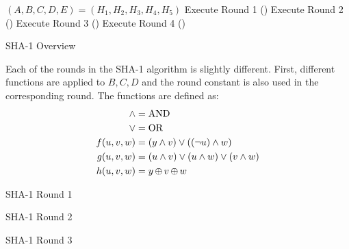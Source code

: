 \begin{algorithm}[H]
  \DontPrintSemicolon{}

  \BlankLine{}

  $(A, B, C, D, E) = (H_{1}, H_{2}, H_{3}, H_{4}, H_{5})$\;
  Execute Round 1 () \;
  Execute Round 2 () \;
  Execute Round 3 () \;
  Execute Round 4 () \;
  \caption{SHA-1 Overview}
  \label{algo:SHA_1_Overview}
\end{algorithm}

Each of the rounds in the SHA-1 algorithm is slightly different.
First, different functions are applied to $B, C, D$ and the round constant is also used in the corresponding round.
The functions are defined as:
\begin{align*}
  \wedge &= \text{AND} \\
  \vee &= \text{OR} \\
  f(u, v, w) &= (y \wedge v) \vee ((\neg u) \wedge w) \\
  g(u, v, w) &= (u \wedge v) \vee (u \wedge w) \vee (v \wedge w) \\
  h(u, v, w) &= y \operatorname{\oplus} v \operatorname{\oplus} w
\end{align*}

\begin{algorithm}[H]
  \DontPrintSemicolon{}
  \caption{SHA-1 Round 1}
  \label{algo:SHA_1_Round_1}
\end{algorithm}

\begin{algorithm}[H]
  \DontPrintSemicolon{}
  \caption{SHA-1 Round 2}
  \label{algo:SHA_1_Round_2}
\end{algorithm}

\begin{algorithm}[H]
  \DontPrintSemicolon{}
  \caption{SHA-1 Round 3}
  \label{algo:SHA_1_Round_3}
\end{algorithm}


